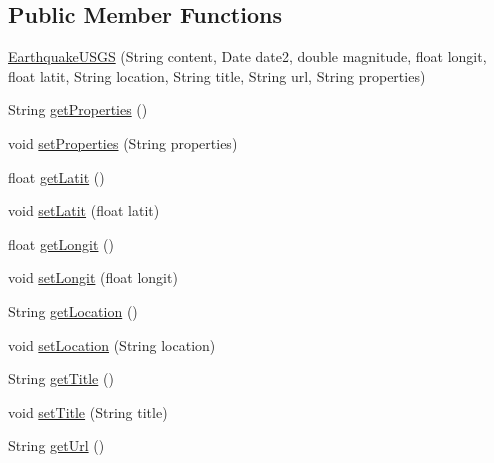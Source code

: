 \subsection*{Public Member Functions}
\begin{DoxyCompactItemize}
\item 
\hyperlink{classbridges_1_1data__src__dependent_1_1_earthquake_u_s_g_s_a681da199afeab00ae170416841f235e2}{Earthquake\+U\+S\+G\+S} (String content, Date date2, double magnitude, float longit, float latit, String location, String title, String url, String properties)
\item 
String \hyperlink{classbridges_1_1data__src__dependent_1_1_earthquake_u_s_g_s_a6676a3f0a11accf6a510648601e05310}{get\+Properties} ()
\item 
void \hyperlink{classbridges_1_1data__src__dependent_1_1_earthquake_u_s_g_s_a2e1ee813dc91081bbd8fd8f5b343f080}{set\+Properties} (String properties)
\item 
float \hyperlink{classbridges_1_1data__src__dependent_1_1_earthquake_u_s_g_s_aa5cacca326360e4aa7179945d51bb9dc}{get\+Latit} ()
\item 
void \hyperlink{classbridges_1_1data__src__dependent_1_1_earthquake_u_s_g_s_a528016222b87f80642073396af6a10ed}{set\+Latit} (float latit)
\item 
float \hyperlink{classbridges_1_1data__src__dependent_1_1_earthquake_u_s_g_s_abcffa65a7ec00dbb617e08d08328bbf3}{get\+Longit} ()
\item 
void \hyperlink{classbridges_1_1data__src__dependent_1_1_earthquake_u_s_g_s_a460d2cf865cfa3a56bbcab8811067bee}{set\+Longit} (float longit)
\item 
String \hyperlink{classbridges_1_1data__src__dependent_1_1_earthquake_u_s_g_s_a703492ad551b68ab6b7821646f9a92ec}{get\+Location} ()
\item 
void \hyperlink{classbridges_1_1data__src__dependent_1_1_earthquake_u_s_g_s_a473107844daa1ef938dd1b78e585185b}{set\+Location} (String location)
\item 
String \hyperlink{classbridges_1_1data__src__dependent_1_1_earthquake_u_s_g_s_a6aa71b4b565be3971c8d3dfae31cb6ed}{get\+Title} ()
\item 
void \hyperlink{classbridges_1_1data__src__dependent_1_1_earthquake_u_s_g_s_a0432f641e0089fc004c441b7239ad6a0}{set\+Title} (String title)
\item 
String \hyperlink{classbridges_1_1data__src__dependent_1_1_earthquake_u_s_g_s_a2af3938390c31096329e635510df437e}{get\+Url} ()
\item 

\end{DoxyCompactItemize}
